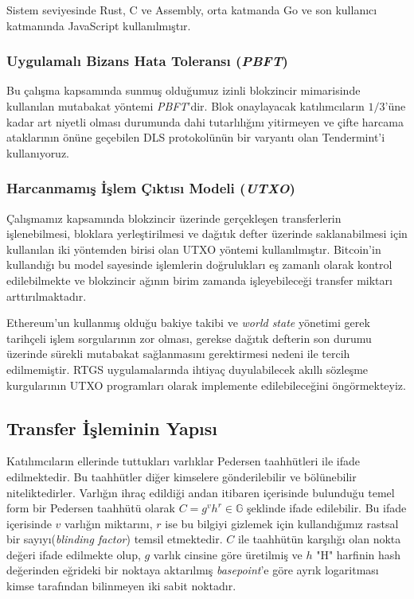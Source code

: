 \documentclass[a4paper,11pt]{article}
\begin{document}
Sistem seviyesinde Rust, C ve Assembly, orta katmanda Go ve son kullanıcı katmanında JavaScript kullanılmıştır.

\subsubsection{Uygulamalı Bizans Hata Toleransı (\emph{PBFT})}

Bu çalışma kapsamında sunmuş olduğumuz izinli blokzincir mimarisinde kullanılan mutabakat yöntemi \emph{PBFT}'dir. Blok onaylayacak katılımcıların $1/3$'üne kadar art niyetli olması durumunda dahi tutarlılığını yitirmeyen ve çifte harcama ataklarının önüne geçebilen DLS\cite{pbft} protokolünün bir varyantı olan Tendermint\cite{tendermint}'i kullanıyoruz.

\subsubsection{Harcanmamış İşlem Çıktısı Modeli (\emph{UTXO})}

Çalışmamız kapsamında blokzincir üzerinde gerçekleşen transferlerin işlenebilmesi, bloklara yerleştirilmesi ve dağıtık defter üzerinde saklanabilmesi için kullanılan iki yöntemden birisi olan UTXO yöntemi kullanılmıştır. Bitcoin'in kullandığı bu model sayesinde işlemlerin doğrulukları eş zamanlı olarak kontrol edilebilmekte ve blokzincir ağının birim zamanda işleyebileceği transfer miktarı arttırılmaktadır.

Ethereum'un kullanmış olduğu bakiye takibi ve \emph{world state} yönetimi gerek tarihçeli işlem sorgularının zor olması, gerekse dağıtık defterin son durumu üzerinde sürekli mutabakat sağlanmasını gerektirmesi nedeni ile tercih edilmemiştir. RTGS uygulamalarında ihtiyaç duyulabilecek akıllı sözleşme kurgularının UTXO programları olarak implemente edilebileceğini öngörmekteyiz.


\subsection{Transfer İşleminin Yapısı}

Katılımcıların ellerinde tuttukları varlıklar Pedersen taahhütleri ile ifade edilmektedir. Bu taahhütler diğer kimselere gönderilebilir ve bölünebilir niteliktedirler. Varlığın ihraç edildiği andan itibaren içerisinde bulunduğu temel form bir Pedersen taahhütü olarak $C=g^{v} h^{r} \in \mathbb{G}$ şeklinde ifade edilebilir. Bu ifade içerisinde $v$ varlığın miktarını, $r$ ise bu bilgiyi gizlemek için kullandığımız rastsal bir sayıyı(\emph{blinding factor}) temsil etmektedir. $C$ ile taahhütün karşılığı olan nokta değeri ifade edilmekte olup, $g$ varlık cinsine göre üretilmiş ve $h$ "H" harfinin hash değerinden eğrideki bir noktaya aktarılmış \emph{basepoint}'e göre ayrık logaritması kimse tarafından bilinmeyen iki sabit noktadır.
\end{document}
